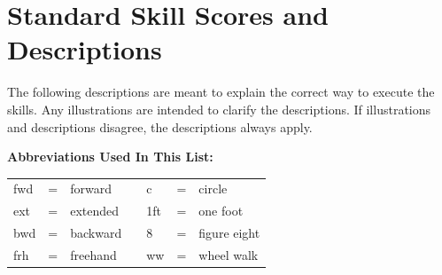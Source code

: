 \section{Standard Skill Scores and Descriptions}
The following descriptions are meant to explain the correct way to execute the skills.
Any illustrations are intended to clarify the descriptions.
If illustrations and descriptions disagree, the descriptions always apply.

\textbf{Abbreviations Used In This List:}
\begin{center}
\begin{tabular}{l l l p{2cm} l l l}
fwd & = & forward & & c & = & circle \\
ext & = & extended & & 1ft & = & one foot \\
bwd & = & backward & & 8 & = & figure eight \\
frh & = & freehand & & ww & = & wheel walk \\
\end{tabular}
\end{center}
\newpage

